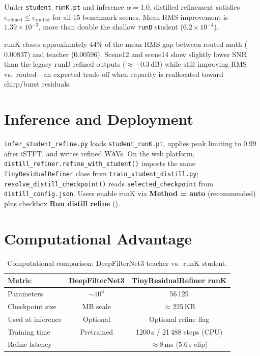 \begin{proposition}
\label{prop:distill_improve}
Under \texttt{student\_runK.pt} and inference $\alpha=1.0$, distilled refinement satisfies $e_{\mathrm{refined}} \le e_{\mathrm{routed}}$ for all 15 benchmark scenes. Mean RMS improvement is $1.39\times10^{-3}$, more than double the shallow \texttt{runD} student ($6.2\times10^{-4}$).
\end{proposition}

runK closes approximately 44\% of the mean RMS gap between routed math ($0.00837$) and teacher ($0.00596$). Scene12 and scene14 show slightly lower SNR than the legacy runD refined outputs ($\approx -0.3$\,dB) while still improving RMS vs.\ routed---an expected trade-off when capacity is reallocated toward chirp/burst residuals.

\section{Inference and Deployment}
\label{sec:inference}

\texttt{infer\_student\_refine.py} loads \texttt{student\_runK.pt}, applies peak limiting to 0.99 after iSTFT, and writes refined WAVs. On the web platform, \texttt{distill\_refiner.refine\_with\_student()} imports the same \texttt{TinyResidualRefiner} class from \texttt{train\_student\_distill.py}; \texttt{resolve\_distill\_checkpoint()} reads \texttt{selected\_checkpoint} from \texttt{distill\_config.json}. Users enable runK via \textbf{Method = auto} (recommended) plus checkbox \textbf{Run distill refine} ().

\section{Computational Advantage}
\label{sec:compute_adv}

\begin{table}[H]
  \centering
  \caption{Computational comparison: DeepFilterNet3 teacher vs.\ runK student.}
  \label{tab:compute_compare}
  \begin{tabular}{lcc}
    \toprule
    \textbf{Metric} & \textbf{DeepFilterNet3} & \textbf{TinyResidualRefiner runK} \\
    \midrule
    Parameters        & $\sim\!10^6$ & 56\,129 \\
    Checkpoint size   & MB scale     & $\approx$225\,KB \\
    Used at inference & Optional     & Optional refine flag \\
    Training time     & Pretrained   & 1200\,s / 21\,488 steps (CPU) \\
    Refine latency    & ---          & $\approx 8$\,ms (5.6\,s clip) \\
    \bottomrule
  \end{tabular}
\end{table}

